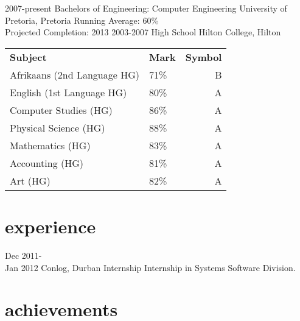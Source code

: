\documentclass[]{friggeri-cv}
\begin{document}
\begin{entrylist}
  \entry
    {2007-present}
    {Bachelors of Engineering: Computer Engineering}
    {University of Pretoria, Pretoria}
    {
		Running Average: 60\% \\
		Projected Completion: 2013}
  \entry
    {2003-2007}
    {High School}
    {Hilton College, Hilton}
    {\begin{tabular}{p{5cm} p{1.5cm} r}
    		\textbf{Subject} & \textbf{Mark} & \textbf{Symbol}\\   		Afrikaans (2nd Language HG) & 71\% & B\\
    		English (1st Language HG) & 80\% & A\\
    		Computer Studies (HG) & 86\% & A\\
    		Physical Science (HG) & 88\% & A\\
    		Mathematics (HG) & 83\% & A\\
    		Accounting (HG) & 81\% & A\\
    		Art (HG) & 82\% & A\\
	\end{tabular}}
\end{entrylist}

\section{experience}

\begin{entrylist}
  \entry
    {Dec 2011-\\ Jan 2012}
    {Conlog, Durban}
    {Internship}
    {Internship in Systems Software Division.}
\end{entrylist}

\section{achievements}
\end{document}
